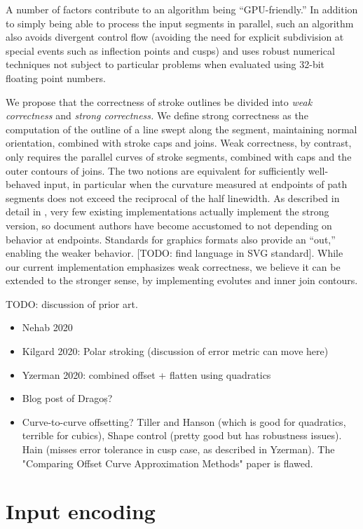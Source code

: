 \documentclass[format=acmsmall]{acmart}
\begin{document}
A number of factors contribute to an algorithm being ``GPU-friendly.'' In addition to simply being able to process the input segments in parallel, such an algorithm also avoids divergent control flow (avoiding the need for explicit subdivision at special events such as inflection points and cusps) and uses robust numerical techniques not subject to particular problems when evaluated using 32-bit floating point numbers.

We propose that the correctness of stroke outlines be divided into \emph{weak correctness} and \emph{strong correctness.} We define strong correctness as the computation of the outline of a line swept along the segment, maintaining normal orientation, combined with stroke caps and joins. Weak correctness, by contrast, only requires the parallel curves of stroke segments, combined with caps and the outer contours of joins. The two notions are equivalent for sufficiently well-behaved input, in particular when the curvature measured at endpoints of path segments does not exceed the reciprocal of the half linewidth. As described in detail in \cite{Nehab2020}, very few existing implementations actually implement the strong version, so document authors have become accustomed to not depending on behavior at endpoints. Standards for graphics formats also provide an ``out,'' enabling the weaker behavior. [TODO: find language in SVG standard]. While our current implementation emphasizes weak correctness, we believe it can be extended to the stronger sense, by implementing evolutes and inner join contours.

TODO: discussion of prior art.

\begin{itemize}
    \item Nehab 2020
    \item Kilgard 2020: Polar stroking (discussion of error metric can move here)
    \item Yzerman 2020: combined offset + flatten using quadratics
    \item Blog post of Dragoș?
    \item Curve-to-curve offsetting? Tiller and Hanson (which is good for quadratics, terrible for cubics), Shape control (pretty good but has robustness issues). Hain (misses error tolerance in cusp case, as described in Yzerman). The "Comparing Offset Curve Approximation Methods" paper is flawed.
\end{itemize}

\section{Input encoding}
\end{document}
